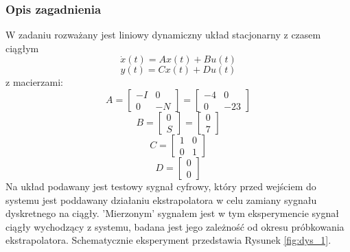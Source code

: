 \documentclass[a4paper,11pt]{article}
\begin{document}
\subsubsection{Opis zagadnienia}
W zadaniu rozważany jest liniowy dynamiczny układ stacjonarny z czasem ciągłym
\begin{equation}
\dot{x}(t) = Ax(t)+Bu(t)
\label{eq:eq_1}
\end{equation}
\begin{equation*}
y(t)=Cx(t)+Du(t)
\end{equation*}
z macierzami:
\begin{equation*}
A = \begin{bmatrix}
-I & 0 \\
0 & -N
\end{bmatrix} =
\begin{bmatrix}
-4 & 0 \\
0 & - 23
\end{bmatrix}
\end{equation*}
\begin{equation*}
B = \begin{bmatrix}
0 \\ S
\end{bmatrix} = 
\begin{bmatrix}
0 \\ 7
\end{bmatrix}
\end{equation*}
\begin{equation*}
C = \begin{bmatrix}
1 & 0 \\ 0 & 1 
\end{bmatrix} 
\end{equation*}
\begin{equation*}
D = \begin{bmatrix}
0 \\ 0 
\end{bmatrix} 
\end{equation*}
Na układ podawany jest testowy sygnał cyfrowy, który przed wejściem do systemu jest poddawany działaniu ekstrapolatora w celu zamiany sygnału dyskretnego na ciągły. 'Mierzonym' sygnałem jest w tym eksperymencie sygnał ciągły wychodzący z systemu, badana jest jego zależność od okresu próbkowania ekstrapolatora. 
\pagestyle{mypage}
Schematycznie eksperyment przedstawia Rysunek \ref{fig:dys_1}.
\end{document}

